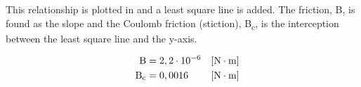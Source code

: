 This relationship is plotted in  and a least square line is added. The friction, B, is found as the slope and the Coulomb friction (stiction), \si{B_c}, is the interception between the least square line and the y-axis.

\begin{align}
  \eq{B}{2,2\cdot 10^{-6}} \unit{N\cdot m}\nonumber\\
  \eq{B_c}{0,0016} \unit{N\cdot m}\nonumber
\end{align}